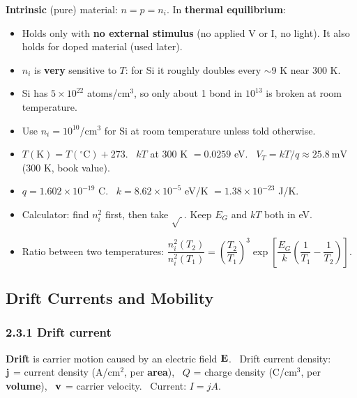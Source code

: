     \textbf{Intrinsic} (pure) material: $n = p = n_i$. \quad In \textbf{thermal equilibrium}: 
    \begin{itemize}
        \item Holds only with \textbf{no external stimulus} (no applied V or I, no light). It also holds for doped material (used later).
        \item $n_i$ is \textbf{very} sensitive to $T$: for Si it roughly doubles every $\sim$9 K near 300 K.
        \item Si has $5\times10^{22}$ atoms/cm$^3$, so only about 1 bond in $10^{13}$ is broken at room temperature.
        \item Use $n_i = 10^{10}$/cm$^3$ for Si at room temperature unless told otherwise.
    \end{itemize}

    \begin{handy}
        \begin{itemize}
            \item $T(\mathrm{K}) = T(^\circ\mathrm{C}) + 273$. \ $kT$ at 300 K $= 0.0259$ eV. \ $V_T = kT/q \approx \SI{25.8}{\milli\volt}$ (300 K, book value).
            \item $q = 1.602\times10^{-19}$ C. \ $k = 8.62\times10^{-5}$ eV/K $= 1.38\times10^{-23}$ J/K.
            \item Calculator: find $n_i^2$ first, then take $\sqrt{\ }$. Keep $E_G$ and $kT$ both in eV.
            \item Ratio between two temperatures: $\dfrac{n_i^2(T_2)}{n_i^2(T_1)} = \left(\dfrac{T_2}{T_1}\right)^3 \exp\!\left[\dfrac{E_G}{k}\left(\dfrac1{T_1} - \dfrac1{T_2}\right)\right]$.
        \end{itemize}
    \end{handy}

    \subsection[2.3]{Drift Currents and Mobility}
    \subsubsection{2.3.1 Drift current}
    \textbf{Drift} is carrier motion caused by an electric field $\mathbf{E}$. \ Drift current density:
    \\
    $\mathbf{j}$ = current density (A/cm$^2$, per \textbf{area}), \ $Q$ = charge density (C/cm$^3$, per \textbf{volume}), \ $\mathbf{v}$ = carrier velocity. \ Current: $I = jA$.

